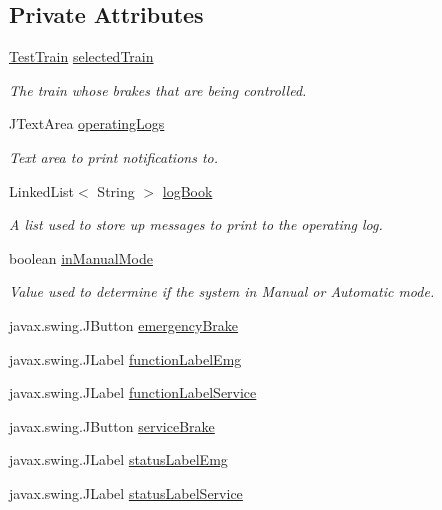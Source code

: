 \subsection*{Private Attributes}
\begin{DoxyCompactItemize}
\item 
\hyperlink{classTrainControllerComps_1_1TestTrain}{Test\+Train} \hyperlink{classTrainControllerComps_1_1TCBrakePanel_ac8f5bb4b6ea27c0d53b99945f9c68141}{selected\+Train}
\begin{DoxyCompactList}\small\item\em The train whose brakes that are being controlled. \end{DoxyCompactList}\item 
J\+Text\+Area \hyperlink{classTrainControllerComps_1_1TCBrakePanel_a2ba550a51ec095044bdebb4cf00f67b6}{operating\+Logs}
\begin{DoxyCompactList}\small\item\em Text area to print notifications to. \end{DoxyCompactList}\item 
Linked\+List$<$ String $>$ \hyperlink{classTrainControllerComps_1_1TCBrakePanel_a78a980aa80c948e54642057226f41e25}{log\+Book}
\begin{DoxyCompactList}\small\item\em A list used to store up messages to print to the operating log. \end{DoxyCompactList}\item 
boolean \hyperlink{classTrainControllerComps_1_1TCBrakePanel_a7ef33ee76ed0b5f0759b24430e196b89}{in\+Manual\+Mode}
\begin{DoxyCompactList}\small\item\em Value used to determine if the system in Manual or Automatic mode. \end{DoxyCompactList}\item 
javax.\+swing.\+J\+Button \hyperlink{classTrainControllerComps_1_1TCBrakePanel_af3b802bb0a81c57ee5429fdd75aeb0ea}{emergency\+Brake}
\item 
javax.\+swing.\+J\+Label \hyperlink{classTrainControllerComps_1_1TCBrakePanel_a076bed5a497e04e53ef355147b17ff99}{function\+Label\+Emg}
\item 
javax.\+swing.\+J\+Label \hyperlink{classTrainControllerComps_1_1TCBrakePanel_a2d6c94b0c372a2bb5ae99003c5f12864}{function\+Label\+Service}
\item 
javax.\+swing.\+J\+Button \hyperlink{classTrainControllerComps_1_1TCBrakePanel_a4cf0bb6697c799dc416ef1f9c08a1c70}{service\+Brake}
\item 
javax.\+swing.\+J\+Label \hyperlink{classTrainControllerComps_1_1TCBrakePanel_afa54fa32b72311b670556a7cfbf8c61c}{status\+Label\+Emg}
\item 
javax.\+swing.\+J\+Label \hyperlink{classTrainControllerComps_1_1TCBrakePanel_ad30222226055f9cc2153bd1d18b717f8}{status\+Label\+Service}
\end{DoxyCompactItemize}


